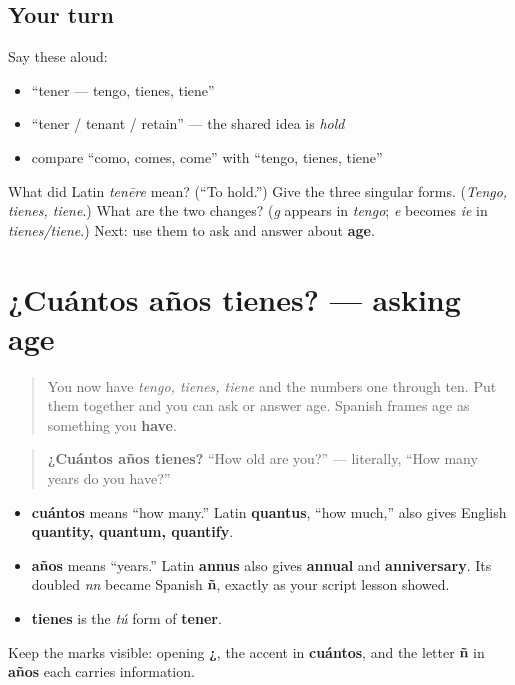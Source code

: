 \subsection*{Your turn}
Say these aloud:

\begin{itemize}
\raggedright
  \item “tener — tengo, tienes, tiene”
  \item “tener / tenant / retain” — the shared idea is \emph{hold}
  \item compare “como, comes, come” with “tengo, tienes, tiene”
\end{itemize}

\begin{tcolorbox}[breakable,colback=teal!4,colframe=teal!35!black,title={Before you move on}]
What did Latin \emph{tenēre} mean? (“To hold.”) Give the three singular forms. (\emph{Tengo, tienes, tiene}.) What are the two changes? (\emph{g} appears in \emph{tengo}; \emph{e} becomes \emph{ie} in \emph{tienes/tiene}.) Next: use them to ask and answer about \textbf{age}.
\end{tcolorbox}
\section[¿Cuántos años tienes?]{¿Cuántos años tienes? — asking age}

\label{lesson:ES-C08-cuantos-anos}



\begin{quote}
You now have \emph{tengo, tienes, tiene} and the numbers one through ten. Put them together and you can ask or answer age. Spanish frames age as something you \textbf{have}.
\end{quote}

\begin{cousinweb}
\begin{quote}
\textbf{¿Cuántos años tienes?} “How old are you?” — literally, “How many years do you have?”
\end{quote}

\begin{itemize}
\raggedright
  \item \textbf{cuántos} means “how many.” Latin \textbf{quantus}, “how much,” also gives English \textbf{quantity, quantum, quantify}.
  \item \textbf{años} means “years.” Latin \textbf{annus} also gives \textbf{annual} and \textbf{anniversary}. Its doubled \emph{nn} became Spanish \textbf{ñ}, exactly as your script lesson showed.
  \item \textbf{tienes} is the \emph{tú} form of \textbf{tener}.
\end{itemize}

Keep the marks visible: opening \textbf{¿}, the accent in \textbf{cuántos}, and the letter \textbf{ñ} in \textbf{años} each carries information.
\end{cousinweb}

